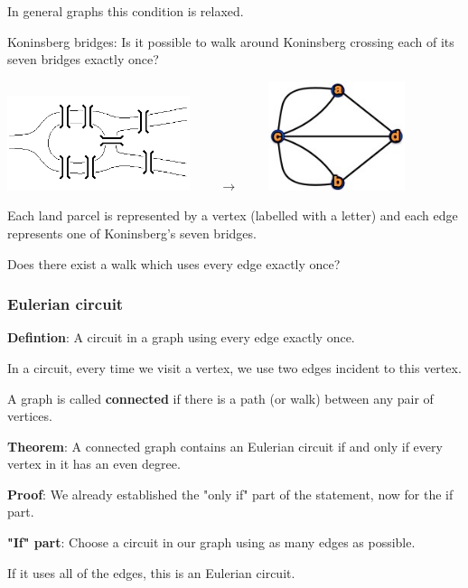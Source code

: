\documentclass[9pt, letterpaper, oneside]{article}
\begin{document}
In general graphs this condition is relaxed.

Koninsberg bridges: Is it possible to walk around Koninsberg crossing each of its seven bridges exactly once?

\includegraphics[width=0.4\textwidth]{konigsberg.jpg}
$\qquad \to\qquad$
\includegraphics[width=0.3\textwidth]{konigsberg_graph.jpg}

Each land parcel is represented by a vertex (labelled with a letter) and each edge represents one of Koninsberg's seven bridges.

Does there exist a walk which uses every edge exactly once?

\subsubsection{Eulerian circuit}
\textbf{Defintion}: A circuit in a graph using every edge exactly once.

In a circuit, every time we visit a vertex, we use two edges incident to this vertex.

A graph is called \textbf{connected} if there is a path (or walk) between any pair of vertices.

\textbf{Theorem}: A connected graph contains an Eulerian circuit if and only if every vertex in it has an even degree. %

\textbf{Proof}: We already established the "only if" part of the statement, now for the if part.

\textbf{"If" part}: Choose a circuit in our graph using as many edges as possible.

If it uses all of the edges, this is an Eulerian circuit. 
\end{document}
